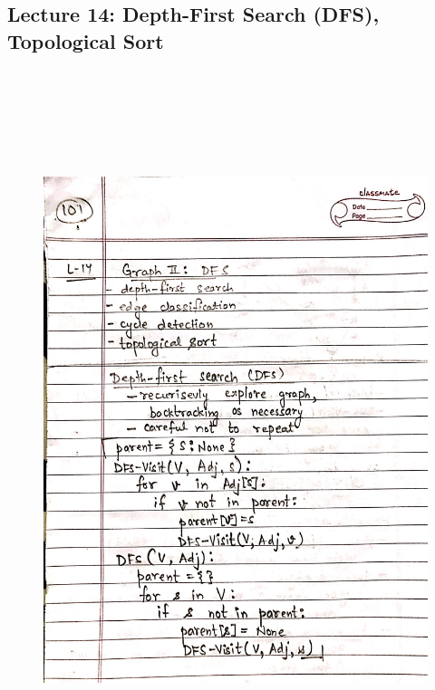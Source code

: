 \newpage
{\color{black} \subsection*{Lecture 14: Depth-First Search (DFS), Topological Sort}}
\begin{figure}[H]
    \centering
    \includegraphics[width=16cm, height=21cm]{"./MIT-6.006/MIT-6006-101"}
\end{figure}

